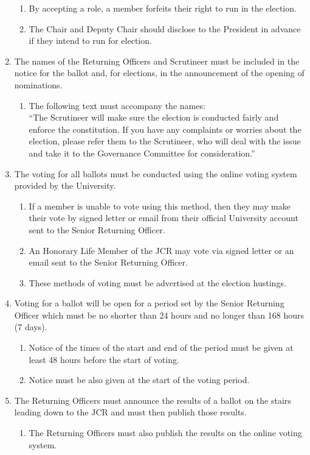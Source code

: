 \documentclass[12pt]{article}
\begin{document}
\begin{enumerate}
\begin{enumerate}
        \item By accepting a role, a member forfeits their right to run in the election.
        \item The Chair and Deputy Chair should disclose to the President in advance if they intend to run for election.
    \end{enumerate}
    \item The names of the Returning Officers and Scrutineer must be included in the notice for the ballot and, for elections, in the announcement of the opening of nominations.
    \begin{enumerate}
        \item The following text must accompany the names:\\
        ``\textrm{The Scrutineer will make sure the election is conducted fairly and enforce the constitution. If you have any complaints or worries about the election, please refer them to the Scrutineer, who will deal with the issue and take it to the Governance Committee for consideration.}''
    \end{enumerate}
    \item The voting for all ballots must be conducted using the online voting system provided by the University.
    \begin{enumerate}
        \item If a member is unable to vote using this method, then they may make their vote by signed letter or email from their official University account sent to the Senior Returning Officer.
        \item An Honorary Life Member of the JCR may vote via signed letter or an email sent to the Senior Returning Officer.
        \item These methods of voting must be advertised at the election hustings.
    \end{enumerate}
    \item Voting for a ballot will be open for a period set by the Senior Returning Officer which must be no shorter than 24 hours and no longer than 168 hours (7 days).
    \begin{enumerate}
        \item Notice of the times of the start and end of the period must be given at least 48 hours before the start of voting.
        \item Notice must be also given at the start of the voting period.
    \end{enumerate}
    \item The Returning Officers must announce the results of a ballot on the stairs leading down to the JCR and must then publish those results.
    \begin{enumerate}
        \item The Returning Officers must also publish the results on the online voting system.
    \end{enumerate}

\end{enumerate}
\end{document}

